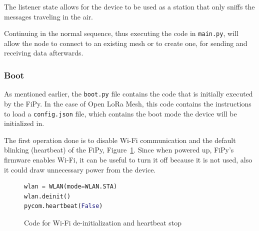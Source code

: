 				The listener state allows for the device to be used as a station that only sniffs the messages traveling in the air.
				
				Continuing in the normal sequence, thus executing the code in \texttt{main.py}, will allow the node to connect to an existing mesh or to create one, for sending and receiving data afterwards.
			
%					
%					
			
			\newpage
			\subsubsection{Boot}
			
				As mentioned earlier, the \texttt{boot.py} file contains the code that is initially executed by the FiPy.
				In the case of Open LoRa Mesh, this code contains the instructions to load a \texttt{config.json} file, which contains the boot mode the device will be initialized in.
				
				The first operation done is to disable Wi-Fi communication and the default blinking (heartbeat) of the FiPy, Figure~\ref{code:boot_1}.
				Since when powered up, FiPy's firmware enables Wi-Fi, it can be useful to turn it off because it is not used, also it could draw unnecessary power from the device.

				\begin{figure}[H]
					\begin{lstlisting}[language=Python]
wlan = WLAN(mode=WLAN.STA)
wlan.deinit()
pycom.heartbeat(False)
					\end{lstlisting}
					\label{code:boot_1}
					\caption{Code for Wi-Fi de-initialization and heartbeat stop}
				\end{figure}

